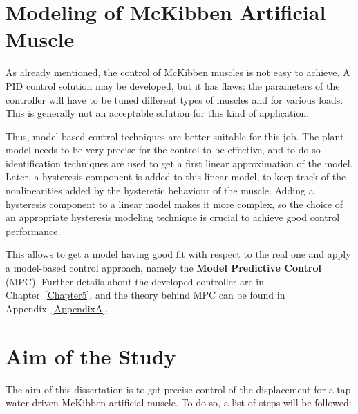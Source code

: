 \section{Modeling of McKibben Artificial Muscle}

As already mentioned, the control of McKibben muscles is not easy to achieve.
A PID control solution may be developed, but it has flaws:
the parameters of the controller will have to be tuned different types of muscles
and for various loads. 
This is generally not an acceptable solution for this kind of application.

Thus, model-based control techniques are better suitable for this job. The plant model
needs to be very precise for the control to be effective, and to do so identification techniques are used to get a first linear approximation of the model.
Later, a hysteresis component is added to this linear model, to keep track of the
nonlinearities added by the hysteretic behaviour of the muscle.
Adding a hysteresis component to a linear model makes it more complex, 
so the choice of an appropriate hysteresis modeling technique is crucial to achieve
good control performance.

This allows to get a model having good fit with respect to the real one
and apply a model-based control approach, namely the \textbf{Model Predictive Control} (MPC).
Further details about the developed controller are in Chapter~\ref{Chapter5},
and the theory behind MPC can be found in Appendix~\ref{AppendixA}.

\section{Aim of the Study}

The aim of this dissertation is to get precise control of the displacement for
a tap water-driven McKibben artificial muscle. To do so, a list of steps will be followed:

